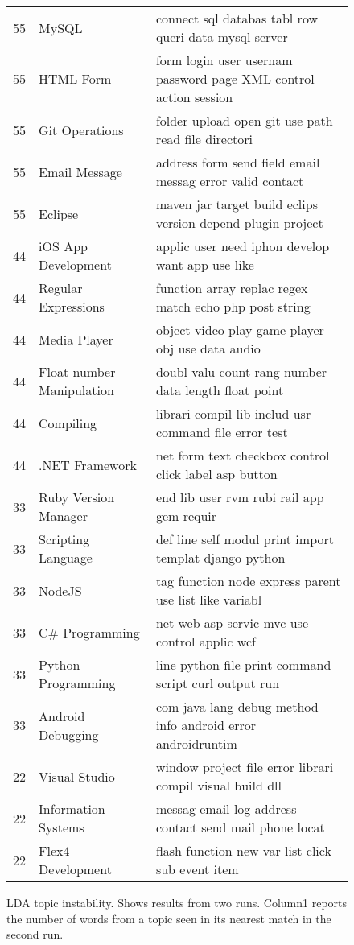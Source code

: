 \begin{figure*}[!t]
\begin{center}
\begin{tabular}{r|l|l}
55 &MySQL & connect sql databas tabl row queri data mysql server\\
55 &HTML Form & form login user usernam password page XML control action session\\
55 &Git Operations & folder upload open git use path read file directori\\
55 &Email Message & address form send field email messag error valid contact\\
55 &Eclipse & maven jar target build eclips version depend plugin project\\
44 &iOS App Development & applic user need iphon develop want app use like\\
44 &Regular Expressions & function array replac regex match echo php post string\\
44 &Media Player & object video play game player obj use data audio \\ 
44 &Float number Manipulation & doubl valu count rang number data length float point\\
44 &Compiling & librari compil lib includ usr command file error test\\
44 &.NET Framework & net form text checkbox control click label asp button\\
33 &Ruby Version Manager & end lib user rvm rubi rail app gem requir\\
33 &Scripting Language & def line self modul print import templat django python\\
33 &NodeJS & tag function node express parent use list like variabl\\
33 & C\# Programming & net web asp servic mvc use control applic wcf \\ 
33 & Python Programming & line python file print command script curl output run \\ 
33 &Android Debugging & com java lang debug method info android error androidruntim\\
22 & Visual Studio & window project file error librari compil visual build dll \\ 
22 & Information Systems & messag email log address contact send mail phone locat \\ 
22 &Flex4 Development & flash function new var list click sub event item
\end{tabular}
\end{center}
\caption{LDA topic instability. Shows results from two runs. Column1 reports the number
of words from a topic seen in its nearest match in the second run.}
\label{fig:olap}
\end{figure*}
